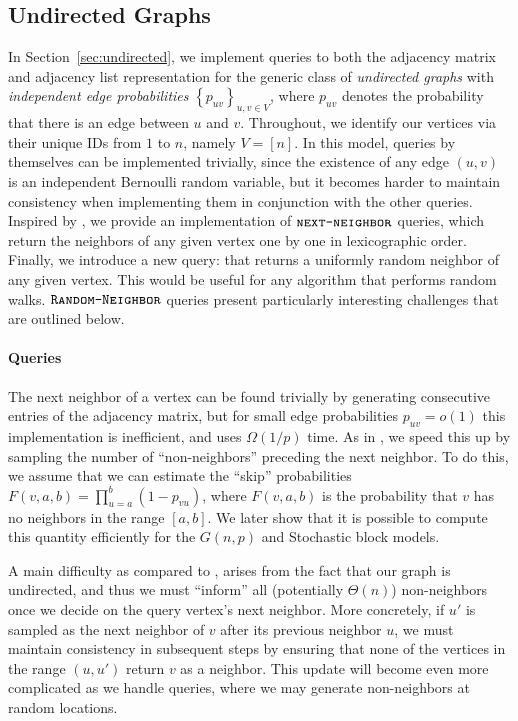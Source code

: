 \subsection{Undirected Graphs}
\label{sec:undirected_graphs}
In Section~\ref{sec:undirected}, we implement queries to both the adjacency matrix and adjacency list representation
for the generic class of \emph{undirected graphs} with {\em independent edge probabilities} $\left\{ p_{uv} \right\}_{u,v\in V}$,
where $p_{uv}$ denotes the probability that there is an edge between $u$ and $v$.
Throughout, we identify our vertices via their unique IDs from $1$ to $n$, namely $V = [n]$.
In this model,  queries by themselves can be implemented trivially,
since the existence of any edge $(u,v)$ is an independent Bernoulli random variable,
but it becomes harder to maintain consistency when implementing them in conjunction with the other queries.
Inspired by \cite{reut}, we provide an implementation of $\texttt{\textsc{next-neighbor}}$ queries,
which return the neighbors of any given vertex one by one in lexicographic order.
Finally, we introduce a new query:  that returns a uniformly random neighbor of any given vertex.
This would be useful for any algorithm that performs random walks.
$\texttt{\textsc{Random-Neighbor}}$ queries present particularly interesting challenges that are outlined below.

\paragraph*{ Queries}
\label{par:next_neighbor_queries}
The next neighbor of a vertex can be found trivially by generating consecutive entries of the adjacency matrix,
but for small edge probabilities $p_{uv} = o(1)$ this implementation is inefficient, and uses $\Omega (1/p)$ time.
As in \cite{reut}, we speed this up by sampling the number of ``non-neighbors'' preceding the next neighbor.
To do this, we assume that we can estimate the ``skip'' probabilities $F(v,a,b)=\prod^{b}_{u=a} (1-p_{vu})$,
where $F(v,a,b)$ is the probability that $v$ has no neighbors in the range $[a,b]$.
We later show that it is possible to compute this quantity efficiently for the $G(n,p)$ and Stochastic block models.

A main difficulty as compared to \cite{reut}, arises from the fact that our graph is undirected,
and thus we must ``inform'' all (potentially $\Theta(n)$) non-neighbors once we decide on the query vertex's next neighbor.
More concretely, if $u'$ is sampled as the next neighbor of $v$ after its previous neighbor $u$,
we must maintain consistency in subsequent steps by ensuring that none of the vertices in the range $(u,u')$ return $v$ as a neighbor.
This update will become even more complicated as we handle  queries, where we may generate non-neighbors at random locations.

